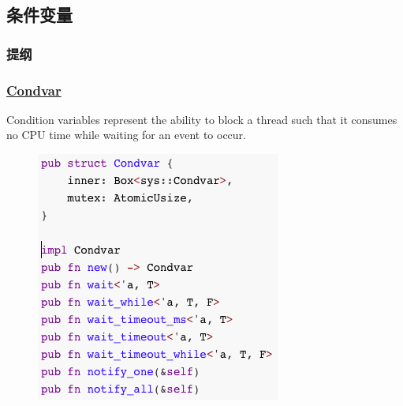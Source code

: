 \subsection{条件变量} %
\begin{frame}
\frametitle{提纲} %
\tableofcontents %
\end{frame}
\begin{frame}[fragile]
    \frametitle{\href{https://doc.rust-lang.org/std/sync/struct.Condvar.html}{Condvar}}

Condition variables represent the ability to block a thread such that it consumes no CPU time while waiting for an event to occur. \pause

    \begin{figure}
    \includegraphics[width=0.37\linewidth]{figs/struct-condvar.png}
    \end{figure}

\end{frame}
% 
% 
